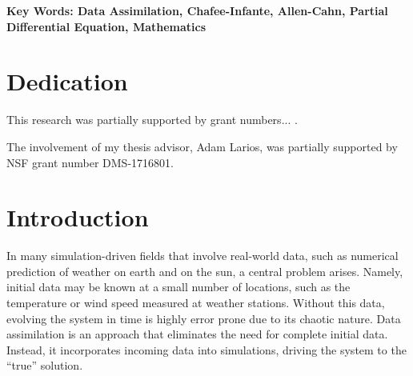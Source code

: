 \documentclass[12pt]{amsart}
\theoremstyle{plain}
\theoremstyle{definition}
\theoremstyle{remark}
\numberwithin{equation}{section} %
\numberwithin{figure}{section}   %
\newcounter{my_counter}
\begin{document}
\bfseries{Key Words:}
\normalfont
Data Assimilation, Chafee-Infante, Allen-Cahn, Partial Differential Equation, Mathematics 
\newpage
{}

\section*{Dedication}\label{dedication}
This research was partially supported by grant numbers... .

The involvement of my thesis advisor, Adam Larios, was partially supported by NSF grant number DMS-1716801.
\newpage
{}

\maketitle
\section{Introduction}\label{secInt}
\noindent
In many simulation-driven fields that involve real-world data, such as numerical prediction of weather on earth and on the sun, a central problem arises. Namely, initial data may be known at a small number of locations, such as the temperature or wind speed measured at weather stations. Without this data, evolving the system in time is highly error prone due to its chaotic nature. Data assimilation is an approach that eliminates the need for complete initial data. Instead, it incorporates incoming data into simulations, driving the system to the ``true'' solution.
\end{document}
